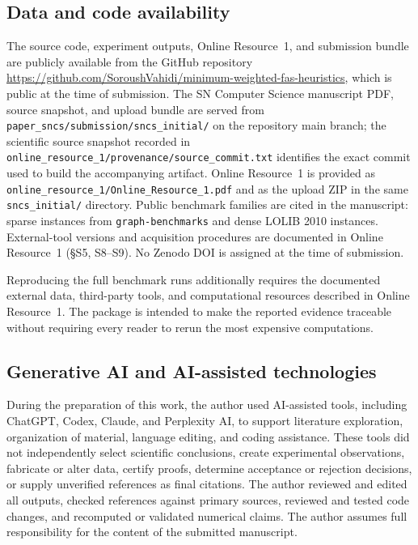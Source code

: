 \subsection*{Data and code availability}
The source code, experiment outputs, Online Resource~1, and submission bundle are publicly available from the GitHub repository \href{https://github.com/SoroushVahidi/minimum-weighted-fas-heuristics}{https://github.com/SoroushVahidi/minimum-weighted-fas-heuristics}, which is public at the time of submission. The SN Computer Science manuscript PDF, source snapshot, and upload bundle are served from \texttt{paper\_sncs/submission/sncs\_initial/} on the repository main branch; the scientific source snapshot recorded in \texttt{online\_resource\_1/provenance/source\_commit.txt} identifies the exact commit used to build the accompanying artifact. Online Resource~1 is provided as \texttt{online\_resource\_1/Online\_Resource\_1.pdf} and as the upload ZIP in the same \texttt{sncs\_initial/} directory. Public benchmark families are cited in the manuscript: sparse instances from \texttt{graph-benchmarks} and dense LOLIB 2010 instances. External-tool versions and acquisition procedures are documented in Online Resource~1 (\S S5, S8--S9). No Zenodo DOI is assigned at the time of submission.

Reproducing the full benchmark runs additionally requires the documented external data, third-party tools, and computational resources described in Online Resource~1. The package is intended to make the reported evidence traceable without requiring every reader to rerun the most expensive computations.

\subsection*{Generative AI and AI-assisted technologies}
During the preparation of this work, the author used AI-assisted tools, including ChatGPT, Codex, Claude, and Perplexity AI, to support literature exploration, organization of material, language editing, and coding assistance. These tools did not independently select scientific conclusions, create experimental observations, fabricate or alter data, certify proofs, determine acceptance or rejection decisions, or supply unverified references as final citations. The author reviewed and edited all outputs, checked references against primary sources, reviewed and tested code changes, and recomputed or validated numerical claims. The author assumes full responsibility for the content of the submitted manuscript.
